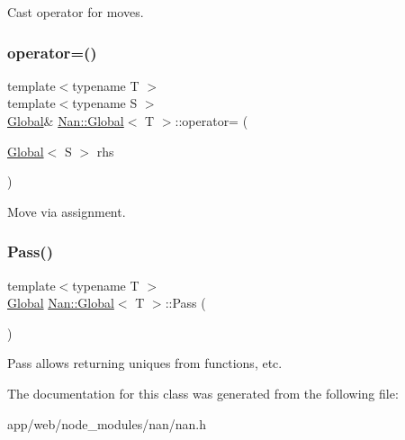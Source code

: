 Cast operator for moves. \mbox{\label{class_nan_1_1_global_ab2b5b4b01bce780eadee83d79baaa89b}} 
\subsubsection{\texorpdfstring{operator=()}{operator=()}}
{\footnotesize\ttfamily template$<$typename T $>$ \\
template$<$typename S $>$ \\
\hyperlink{class_nan_1_1_global}{Global}\& \hyperlink{class_nan_1_1_global}{Nan\+::\+Global}$<$ T $>$\+::operator= (\begin{DoxyParamCaption}\item[{\hyperlink{class_nan_1_1_global}{Global}$<$ S $>$}]{rhs }\end{DoxyParamCaption})\hspace{0.3cm}{\ttfamily [inline]}}

Move via assignment. \mbox{\label{class_nan_1_1_global_a175939847770ba36c56e18f26e46353c}} 
\subsubsection{\texorpdfstring{Pass()}{Pass()}}
{\footnotesize\ttfamily template$<$typename T $>$ \\
\hyperlink{class_nan_1_1_global}{Global} \hyperlink{class_nan_1_1_global}{Nan\+::\+Global}$<$ T $>$\+::Pass (\begin{DoxyParamCaption}{ }\end{DoxyParamCaption})\hspace{0.3cm}{\ttfamily [inline]}}

Pass allows returning uniques from functions, etc. 

The documentation for this class was generated from the following file\+:\begin{DoxyCompactItemize}
\item 
app/web/node\+\_\+modules/nan/nan.\+h\end{DoxyCompactItemize}
